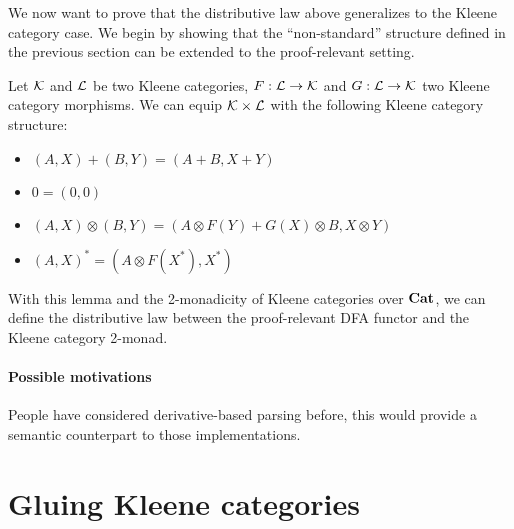 \documentclass[acmsmall,anonymous,review,screen]{acmart}
\newcommand{\cat}[1]{
  \relax
  \StrLen{#1}[\arglength]
  \ifnum\arglength=1
  \mathcal{#1}
  \else
  \mathbf{#1}
  \fi
}
\begin{document}
We now want to prove that the distributive law above generalizes to
the Kleene category case. We begin by showing that the ``non-standard''
structure defined in the previous section can be extended to the
proof-relevant setting.

\begin{lemma}
  Let $\cat{K}$ and $\cat{L}$ be two Kleene categories, $F : \cat{L}
  \to \cat{K}$ and $G : \cat{L} \to \cat{K}$ two Kleene category
  morphisms. We can equip $\cat{K} \times \cat{L}$ with the following
  Kleene category structure:
  \begin{itemize}
  \item $(A, X) + (B, Y) = (A + B, X + Y)$
  \item $0 = (0, 0)$
  \item $(A, X) \otimes (B, Y) = (A \otimes F(Y) + G(X) \otimes B, X \otimes Y)$
  \item $(A, X)^* = (A \otimes F(X^*), X^*)$
  \end{itemize}
\end{lemma}

With this lemma and the 2-monadicity of Kleene categories over $\cat{Cat}$,
we can define the distributive law between the proof-relevant
DFA functor and the Kleene category 2-monad.

\paragraph{Possible motivations}

People have considered derivative-based parsing before, this would provide
a semantic counterpart to those implementations.


\section{Gluing Kleene categories}
\end{document}
